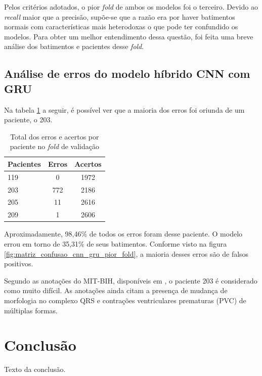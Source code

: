 \documentclass[
    12pt,                %
    openright,           %
    oneside,             %
    a4paper,             %
    brazil               %
]{abntex2}
\begin{document}
Pelos critérios adotados, o pior \textit{fold} de ambos os modelos foi o terceiro. Devido ao \textit{recall} maior que a precisão, supõe-se que 
a razão era por haver batimentos normais com características mais heterodoxas o que pode ter confundido os modelos. Para obter um melhor entendimento
dessa questão, foi feita uma breve análise dos batimentos e pacientes desse \textit{fold}. 

\section{Análise de erros do modelo híbrido CNN com GRU}
\label{sec:analise_erros_cnn_gru}

Na tabela \ref{tab:erros_acertos_por_paciente} a seguir, é possível ver que a maioria dos erros foi oriunda de um paciente, o 203.

\begin{table}[H]
\centering
\caption{Total dos erros e acertos por paciente no \textit{fold} de validação}
\label{tab:erros_acertos_por_paciente}
\begin{tabular}{lcc}
\hline
\textbf{Pacientes} & \textbf{Erros} & \textbf{Acertos}\\
\hline
119 & 0 &  1972 \\
203 & 772  & 2186\\
205 & 11 & 2616\\
209 & 1 & 2606\\
\hline
\end{tabular}
\end{table}

Aproximadamente, 98,46\% de todos os erros foram desse paciente. O modelo errou em torno de 35,31\% de seus batimentos. Conforme visto na 
figura \ref{fig:matriz_confusao_cnn_gru_pior_fold}, a maioria desses erros são de falsos positivos.

Segundo as anotações do MIT-BIH, disponíveis em \cite{physionet_annotations}, o paciente 203 é considerado como muito difícil. As anotações ainda citam
a presença de mudança de morfologia no complexo QRS e contrações ventriculares prematuras (PVC) de múltiplas formas.



\chapter{Conclusão}

Texto da conclusão.



\end{document}

